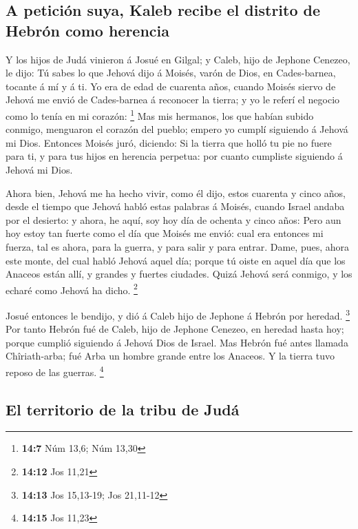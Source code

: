 \hypertarget{a-peticiuxf3n-suya-kaleb-recibe-el-distrito-de-hebruxf3n-como-herencia}{%
\subsection{A petición suya, Kaleb recibe el distrito de Hebrón como
herencia}\label{a-peticiuxf3n-suya-kaleb-recibe-el-distrito-de-hebruxf3n-como-herencia}}

 Y los hijos de Judá vinieron á Josué en Gilgal; y Caleb,
hijo de Jephone Cenezeo, le dijo: Tú sabes lo que Jehová dijo á Moisés,
varón de Dios, en Cades-barnea, tocante á mí y á ti.  Yo
era de edad de cuarenta años, cuando Moisés siervo de Jehová me envió de
Cades-barnea á reconocer la tierra; y yo le referí el negocio como lo
tenía en mi corazón: \footnote{\textbf{14:7} Núm 13,6; Núm 13,30}
 Mas mis hermanos, los que habían subido conmigo,
menguaron el corazón del pueblo; empero yo cumplí siguiendo á Jehová mi
Dios.  Entonces Moisés juró, diciendo: Si la tierra que
holló tu pie no fuere para ti, y para tus hijos en herencia perpetua:
por cuanto cumpliste siguiendo á Jehová mi Dios.

 Ahora bien, Jehová me ha hecho vivir, como él dijo,
estos cuarenta y cinco años, desde el tiempo que Jehová habló estas
palabras á Moisés, cuando Israel andaba por el desierto: y ahora, he
aquí, soy hoy día de ochenta y cinco años:  Pero aun hoy
estoy tan fuerte como el día que Moisés me envió: cual era entonces mi
fuerza, tal es ahora, para la guerra, y para salir y para entrar.
 Dame, pues, ahora este monte, del cual habló Jehová
aquel día; porque tú oiste en aquel día que los Anaceos están allí, y
grandes y fuertes ciudades. Quizá Jehová será conmigo, y los echaré como
Jehová ha dicho. \footnote{\textbf{14:12} Jos 11,21}

 Josué entonces le bendijo, y dió á Caleb hijo de Jephone
á Hebrón por heredad. \footnote{\textbf{14:13} Jos 15,13-19; Jos
  21,11-12}  Por tanto Hebrón fué de Caleb, hijo de
Jephone Cenezeo, en heredad hasta hoy; porque cumplió siguiendo á Jehová
Dios de Israel.  Mas Hebrón fué antes llamada
Chîriath-arba; fué Arba un hombre grande entre los Anaceos. Y la tierra
tuvo reposo de las guerras. \footnote{\textbf{14:15} Jos 11,23}

\hypertarget{el-territorio-de-la-tribu-de-juduxe1}{%
\subsection{El territorio de la tribu de
Judá}\label{el-territorio-de-la-tribu-de-juduxe1}}

